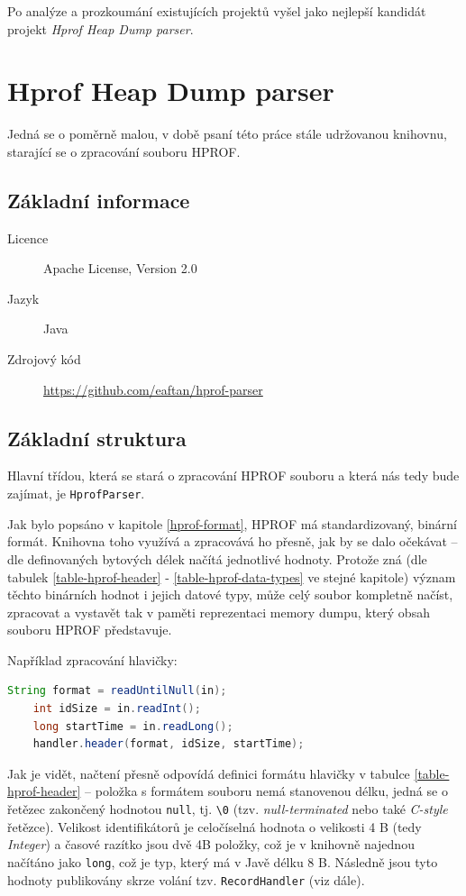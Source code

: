 Po analýze a prozkoumání existujících projektů vyšel jako nejlepší kandidát projekt \textit{Hprof Heap Dump parser}.

\section{Hprof Heap Dump parser}
Jedná se o poměrně malou, v době psaní této práce stále udržovanou knihovnu, starající se o zpracování souboru HPROF. 

\subsection{Základní informace}

\begin{description}
    \item[Licence] Apache License, Version 2.0
    \item[Jazyk] Java
    \item[Zdrojový kód] \url{https://github.com/eaftan/hprof-parser}
\end{description}

\subsection{Základní struktura}
Hlavní třídou, která se stará o zpracování HPROF souboru a která nás tedy bude zajímat, je \texttt{HprofParser}. 

Jak bylo popsáno v kapitole \ref{hprof-format}, HPROF má standardizovaný, binární formát. Knihovna toho využívá a zpracovává ho přesně, jak by se dalo očekávat -- dle definovaných bytových délek načítá jednotlivé hodnoty. Protože zná (dle tabulek \ref{table-hprof-header} - \ref{table-hprof-data-types} ve stejné kapitole) význam těchto binárních hodnot i jejich datové typy, může celý soubor kompletně načíst, zpracovat a vystavět tak v paměti reprezentaci memory dumpu, který obsah souboru HPROF představuje.

Například zpracování hlavičky:

\begin{lstlisting}[caption={Příklad zpracování hlavičky ze souboru HPROF}, frame={single}, language={java}]
    String format = readUntilNull(in);
    int idSize = in.readInt();
    long startTime = in.readLong();
    handler.header(format, idSize, startTime);
\end{lstlisting}

Jak je vidět, načtení přesně odpovídá definici formátu hlavičky v tabulce \ref{table-hprof-header} -- položka s formátem souboru nemá stanovenou délku, jedná se o řetězec zakončený hodnotou \texttt{null}, tj. \texttt{\textbackslash0} (tzv. \textit{null-terminated} nebo také \textit{C-style} řetězce). Velikost identifikátorů je celočíselná hodnota o velikosti 4 B (tedy \textit{Integer}) a časové razítko jsou dvě 4B položky, což je v knihovně najednou načítáno jako \texttt{long}, což je typ, který má v Javě délku 8 B. Následně jsou tyto hodnoty publikovány skrze volání tzv. \texttt{RecordHandler} (viz dále).


